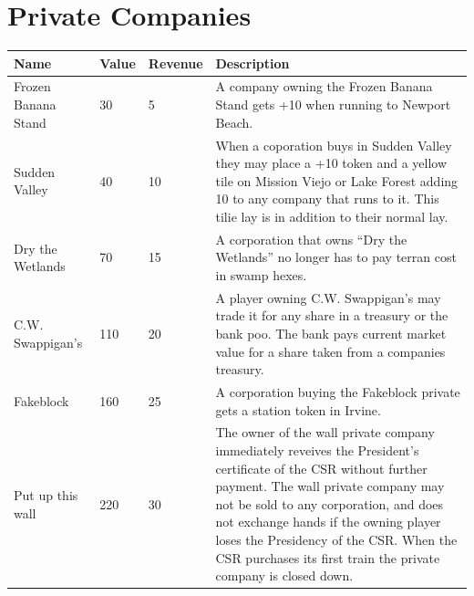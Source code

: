 \documentclass[letterpaper]{article}
\begin{document}
\newpage

\section{Private Companies}
\begin{tabularx}{\linewidth}{l|l|l|X}
  \hline
  \textbf{Name} & \textbf{Value} & \textbf{Revenue} & \textbf{Description} \\
  \hline
  \hline
  Frozen Banana Stand & 30 & 5 & A company owning the Frozen Banana Stand gets +10 when running to Newport Beach. \\
  \hline
  Sudden Valley & 40 & 10 & When a coporation buys in Sudden Valley they may place a +10 token and a yellow tile on Mission Viejo or Lake Forest adding 10 to any company that runs to it. This tilie lay is in addition to their normal lay. \\
  \hline
  Dry the Wetlands & 70 & 15 & A corporation that owns ``Dry the Wetlands'' no longer has to pay terran cost in swamp hexes. \\
  \hline
  C.W. Swappigan's & 110 & 20 & A player owning C.W. Swappigan's may trade it for any share in a treasury or the bank poo. The bank pays current market value for a share taken from a companies treasury. \\
  \hline
  Fakeblock & 160 & 25 & A corporation buying the Fakeblock private gets a station token in Irvine. \\
  \hline
  Put up this wall & 220 & 30 & The owner of the wall private company immediately reveives the President's certificate of the CSR without further payment. The wall private company may not be sold to any corporation, and does not exchange hands if the owning player loses the Presidency of the CSR. When the CSR purchases its first train the private company is closed down. \\
  \hline
\end{tabularx}
\end{document}
